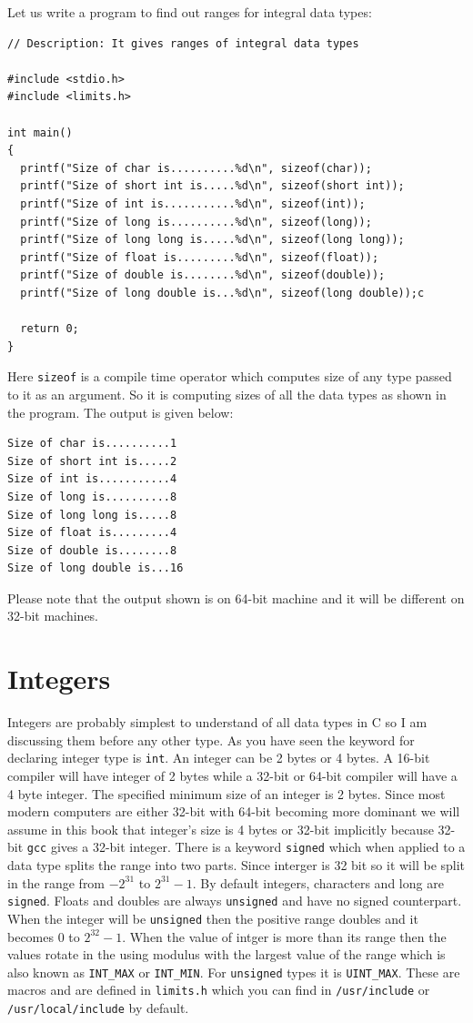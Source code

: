 Let us write a program to find out ranges for integral data types:

\begin{verbatim}
// Description: It gives ranges of integral data types

#include <stdio.h>
#include <limits.h>

int main()
{
  printf("Size of char is..........%d\n", sizeof(char));
  printf("Size of short int is.....%d\n", sizeof(short int));
  printf("Size of int is...........%d\n", sizeof(int));
  printf("Size of long is..........%d\n", sizeof(long));
  printf("Size of long long is.....%d\n", sizeof(long long));
  printf("Size of float is.........%d\n", sizeof(float));
  printf("Size of double is........%d\n", sizeof(double));
  printf("Size of long double is...%d\n", sizeof(long double));c

  return 0;
}
\end{verbatim}

Here \texttt{sizeof} is a compile time operator which computes size of any type
passed to it as an argument. So it is computing sizes of all the data types as
shown in the program. The output is given below:

\begin{verbatim}
Size of char is..........1
Size of short int is.....2
Size of int is...........4
Size of long is..........8
Size of long long is.....8
Size of float is.........4
Size of double is........8
Size of long double is...16
\end{verbatim}

Please note that the output shown is on 64-bit machine and it will be different
on 32-bit machines.

\section{Integers}
Integers are probably simplest to understand of all data types in C so I am
discussing them before any other type. As you have seen the keyword for
declaring integer type is \texttt{int}. An integer can be 2 bytes or 4 bytes. A
16-bit compiler will have integer of 2 bytes while a 32-bit or 64-bit compiler
will have a 4 byte integer. The specified minimum size of an integer is 2
bytes. Since most modern computers are either 32-bit with
64-bit becoming more dominant we will assume in this book that integer's size
is 4 bytes or 32-bit implicitly because 32-bit \texttt{gcc} gives a 32-bit
integer. There is a keyword \texttt{signed} which when 
applied to a data type splits the range into two parts. Since interger is 32
bit so it will be split in the range from $-2^{31}$ to $2^{31} - 1$. By default
integers, characters and long are \texttt{signed}. Floats and doubles are
always \texttt{unsigned} and have no signed counterpart. When the integer will
be \texttt{unsigned} then the positive range doubles and it becomes $0$ to
$2^{32} - 1$. When the value of intger is more than its range then the values
rotate in the using modulus with the largest value of the range which is also
known as \texttt{INT\_MAX} or \texttt{INT\_MIN}. For \texttt{unsigned} types it
is \texttt{UINT\_MAX}. These are macros and are defined in \texttt{limits.h}
which you can find in \texttt{/usr/include} or \texttt{/usr/local/include} by
default.

